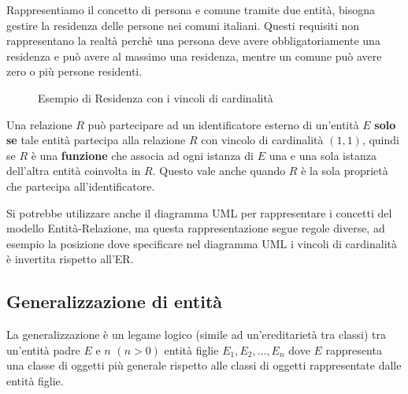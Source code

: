 \documentclass[a4paper]{article}
\begin{document}
\begin{example}
  Rappresentiamo il concetto di persona e comune tramite due entità, bisogna gestire
  la residenza delle persone nei comuni italiani. Questi requisiti non rappresentano
  la realtà perchè una persona deve avere obbligatoriamente una residenza e può avere
  al massimo una residenza, mentre un comune può avere zero o più persone residenti.
  \begin{figure}[H]
    \centering
    \caption{Esempio di Residenza con i vincoli di cardinalità}
  \end{figure}
\end{example}

\begin{definition}
  Una relazione \( R \) può partecipare ad un identificatore esterno di un'entità \( E \)
  \textbf{solo se} tale entità partecipa alla relazione \( R \) con vincolo di
  cardinalità \( (1, 1) \), quindi se \( R \) è una \textbf{funzione} che associa ad
  ogni istanza di \( E \) una e una sola istanza dell'altra entità coinvolta in \( R \).
  Questo vale anche quando \( R \) è la sola proprietà che partecipa all'identificatore.
\end{definition}

\vspace{1em}
\noindent
Si potrebbe utilizzare anche il diagramma UML per rappresentare i concetti del modello
Entità-Relazione, ma questa rappresentazione segue regole diverse, ad esempio la
posizione dove specificare nel diagramma UML i vincoli di cardinalità è invertita rispetto
all'ER.

\subsection{Generalizzazione di entità}
La generalizzazione è un legame logico (simile ad un'ereditarietà tra classi) tra un'entità
padre \( E \) e \( n \) \( (n > 0) \) entità figlie \( E_1, E_2, \ldots, E_n \) dove
\( E \) rappresenta una classe di oggetti più generale rispetto alle classi di oggetti
rappresentate dalle entità figlie.
\end{document}

